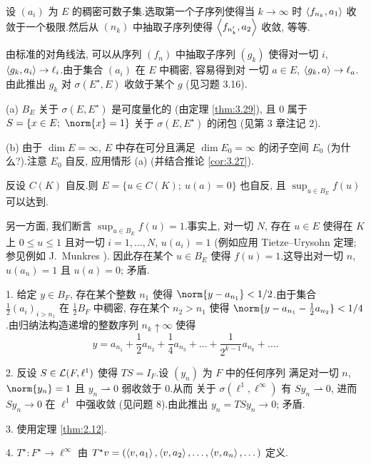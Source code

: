 设 $(a_i)$ 为 $E$ 的稠密可数子集.选取第一个子序列使得当 $k\to\infty$ 时
$\left\langle f_{n_k},a_1\right\rangle$ 收敛于一个极限.然后从 $(n_k)$ 中抽取子序列使得
$\left\langle f_{n'_k},a_2\right\rangle$ 收敛, 等等.

由标准的对角线法, 可以从序列 $(f_n)$ 中抽取子序列 $(g_k)$ 使得对一切 $i$,
$\left\langle g_k,a_i\right\rangle\to\ell_i$.由于集合 $(a_i)$ 在 $E$ 中稠密, 容易得到对
一切 $a\in E$, $\left\langle g_k,a\right\rangle\to\ell_a$.由此推出 $g_k$ 对
$\sigma(E^\star,E)$ 收敛于某个 $g$ (见习题 3.16).


(a) $B_E$ 关于 $\sigma(E,E^\star)$ 是可度量化的 (由定理  \ref{thm:3.29}), 且
$0$ 属于 $S=\{x\in E;\ \norm{x}=1\}$ 关于 $\sigma(E,E^\star)$ 的闭包 (见第
3 章注记 2).

(b) 由于 $\dim E=\infty$, $E$ 中存在可分且满足 $\dim E_0=\infty$ 的闭子空间
$E_0$ (为什么?).注意 $E_0$ 自反, 应用情形 (a) (并结合推论  \ref{cor:3.27}).


反设 $C(K)$ 自反.则 $E=\{u\in C(K);\ u(a)=0\}$ 也自反, 且
$\sup_{u\in B_E}f(u)$ 可以达到.

另一方面, 我们断言 $\sup_{u\in B_E}f(u)=1$.事实上, 对一切 $N$, 存在
$u\in E$ 使得在 $K$ 上 $0\le u\le1$ 且对一切 $i=1,\dots,N$, $u(a_i)=1$
(例如应用 Tietze--Urysohn 定理; 参见例如 J.~Munkres ).
因此存在某个 $u\in B_E$ 使得 $f(u)=1$.这导出对一切 $n$, $u(a_n)=1$ 且
$u(a)=0$; 矛盾.


1. 给定 $y\in B_F$, 存在某个整数 $n_1$ 使得 $\norm{y-a_{n_1}}<1/2$.由于集合
$\frac12(a_i)_{i>n_1}$ 在 $\frac12B_F$ 中稠密, 存在某个 $n_2>n_1$ 使得
$\norm{y-a_{n_1}-\frac12a_{n_2}}<1/4$.由归纳法构造递增的整数序列
$n_k\uparrow\infty$ 使得
\begin{equation*}
y=a_{n_1}+\frac12a_{n_2}+\frac14a_{n_3}+\dots+\frac{1}{2^{k-1}}a_{n_k}+\dots.
\end{equation*}

2. 反设 $S\in\mathcal{L}(F,\ell^1)$ 使得 $TS=I_F$.设 $(y_n)$ 为 $F$ 中的任何序列
满足对一切 $n$, $\norm{y_n}=1$ 且 $y_n\rightharpoonup0$ 弱收敛于 $0$.从而
关于 $\sigma(\ell^1,\ell^\infty)$ 有 $Sy_n\rightharpoonup0$, 进而 $Sy_n\to0$
在 $\ell^1$ 中强收敛 (见问题 8).由此推出 $y_n=TSy_n\to0$; 矛盾.

3. 使用定理  \ref{thm:2.12}.

4. $T^\star:F^\star\to\ell^\infty$ 由
$T^\star v=(\left\langle v,a_1\right\rangle,\left\langle v,a_2\right\rangle,\dots,\left\langle v,a_n\right\rangle,\dots)$ 定义.


